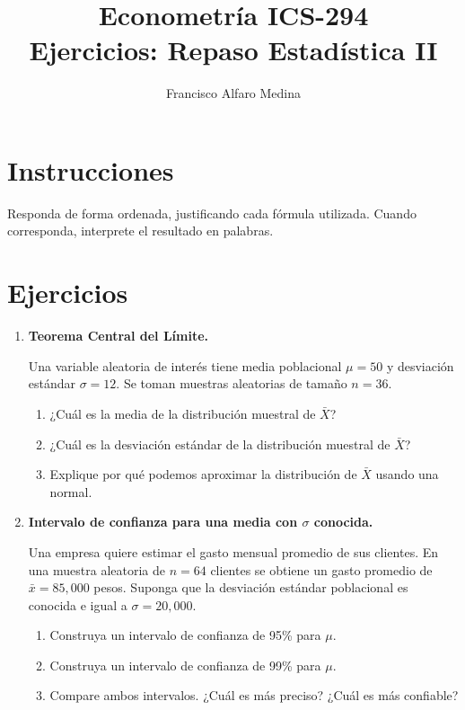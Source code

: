 \documentclass[11pt]{article}
\title{Econometría ICS-294\\Ejercicios: Repaso Estadística II}
\author{Francisco Alfaro Medina}
\date{}
\begin{document}
\maketitle

\section*{Instrucciones}
Responda de forma ordenada, justificando cada fórmula utilizada. Cuando corresponda, interprete el resultado en palabras.

\section*{Ejercicios}

\begin{enumerate}[label=\textbf{Ejercicio \arabic*.}, leftmargin=*]
    \item \textbf{Teorema Central del Límite.}
    
    Una variable aleatoria de interés tiene media poblacional $\mu=50$ y desviación estándar $\sigma=12$. Se toman muestras aleatorias de tamaño $n=36$.
    \begin{enumerate}[label=\alph*)]
        \item ¿Cuál es la media de la distribución muestral de $\bar{X}$?
        \item ¿Cuál es la desviación estándar de la distribución muestral de $\bar{X}$?
        \item Explique por qué podemos aproximar la distribución de $\bar{X}$ usando una normal.
    \end{enumerate}

    \item \textbf{Intervalo de confianza para una media con $\sigma$ conocida.}
    
    Una empresa quiere estimar el gasto mensual promedio de sus clientes. En una muestra aleatoria de $n=64$ clientes se obtiene un gasto promedio de $\bar{x}=85{,}000$ pesos. Suponga que la desviación estándar poblacional es conocida e igual a $\sigma=20{,}000$.
    \begin{enumerate}[label=\alph*)]
        \item Construya un intervalo de confianza de 95\% para $\mu$.
        \item Construya un intervalo de confianza de 99\% para $\mu$.
        \item Compare ambos intervalos. ¿Cuál es más preciso? ¿Cuál es más confiable?
    \end{enumerate}


\end{enumerate}
\end{document}
